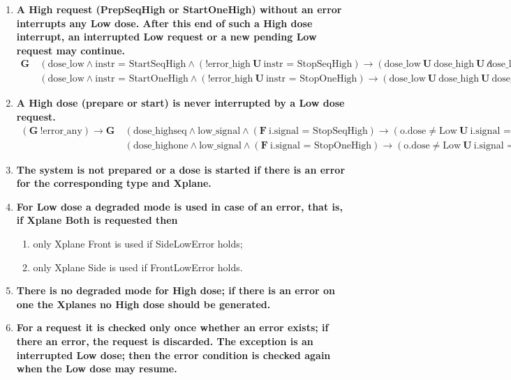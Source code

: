 \documentclass[a4paper,10pt]{article}
\newcommand{\LTLG}{\mathbf{G~}}
\newcommand{\LTLF}{\mathbf{F~}}
\newcommand{\LTLU}{\mathbf{~U~}}
\newcommand{\imply}{\rightarrow}
\newcommand{\doselow}{\textrm{dose\_low}}
\newcommand{\dosehigh}{\textrm{dose\_high}}
\newcommand{\dosehighseq}{\textrm{dose\_highseq}}
\newcommand{\dosehighone}{\textrm{dose\_highone}}
\newcommand{\lowsignal}{\textrm{low\_signal}}
\newcommand{\errorany}{\textrm{error\_any}}
\newcommand{\errorhigh}{\textrm{error\_high}}
\begin{document}
\begin{enumerate}
		\item \textbf{A High request (PrepSeqHigh or StartOneHigh) without an error interrupts any Low dose. After this end of such a High dose interrupt, an interrupted Low request or a new pending Low request may continue.}
			\begin{align*}
				\LTLG & (\doselow \land \textrm{instr = StartSeqHigh} \land (!\errorhigh \LTLU \textrm{instr = StopSeqHigh}) \imply (\doselow \LTLU \dosehigh \LTLU \doselow)) \land \\
					&(\doselow \land \textrm{instr = StartOneHigh} \land (!\errorhigh \LTLU \textrm{instr = StopOneHigh}) \imply (\doselow \LTLU \dosehigh \LTLU \doselow))
			\end{align*}

		\item \textbf{A High dose (prepare or start) is never interrupted by a Low dose request.}
			\begin{align*}
				(\LTLG !\errorany) \imply \LTLG & (\dosehighseq \land \lowsignal \land (\LTLF \textrm{i.signal = StopSeqHigh}) \imply (\textrm{o.dose} \neq \textrm{Low} \LTLU \textrm{i.signal = StopSeqHigh})) \land \\
					& (\dosehighone \land \lowsignal \land (\LTLF \textrm{i.signal = StopOneHigh}) \imply (\textrm{o.dose} \neq \textrm{Low} \LTLU \textrm{i.signal = StopOneHigh}))
			\end{align*}
	
		\item \textbf{The system is not prepared or a dose is started if there is an error for the corresponding type and Xplane.}
		\item \textbf{For Low dose a degraded mode is used in case of an error, that is, if Xplane Both is requested then}
			\begin{enumerate}
				\item only Xplane Front is used if SideLowError holds;
				\item only Xplane Side is used if FrontLowError holds.
			
			\end{enumerate}
		\item \textbf{There is no degraded mode for High dose; if there is an error on one the Xplanes no High dose should be generated.}
		\item \textbf{For a request it is checked only once whether an error exists; if there an error, the request is discarded.
			The exception is an interrupted Low dose; then the error condition is checked again when the Low dose may resume.}
			

\end{enumerate}
\end{document}
